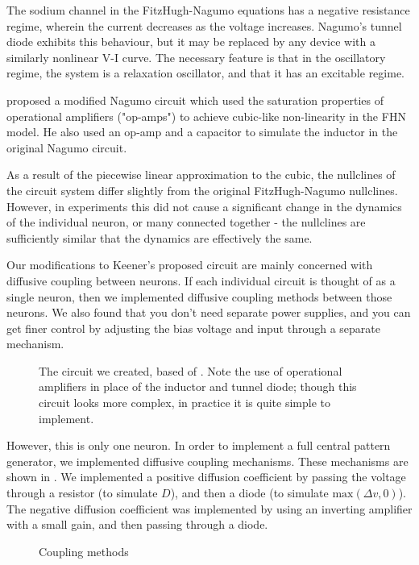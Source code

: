\documentclass[
    11pt,
]{article}
\begin{document}
The sodium channel in the FitzHugh-Nagumo equations has a negative resistance regime, wherein the current decreases as the voltage increases.  Nagumo's tunnel diode exhibits this behaviour, but it may be replaced by any device with a similarly nonlinear V-I curve.  The necessary feature is that in the oscillatory regime, the system is a relaxation oscillator, and that it has an excitable regime.

\citet{keener1983} proposed a modified Nagumo circuit which used the saturation properties of operational amplifiers ("op-amps") to achieve cubic-like non-linearity in the FHN model. He also used an op-amp and a capacitor to simulate the inductor in the original Nagumo circuit.

As a result of the piecewise linear approximation to the cubic, the nullclines of the circuit system differ slightly from the original FitzHugh-Nagumo nullclines.  However, in experiments this did not cause a significant change in the dynamics of the individual neuron, or many connected together - the nullclines are sufficiently similar that the dynamics are effectively the same.

Our modifications to Keener's proposed circuit are mainly concerned with diffusive coupling between neurons.  If each individual circuit is thought of as a single neuron, then we implemented diffusive coupling methods between those neurons.  We also found that you don't need separate power supplies, and you can get finer control by adjusting the bias voltage and input through a separate mechanism.

\begin{figure}[h!]
    \centering
    \caption{The circuit we created, based of \citet{keener1983}.  Note the use of operational amplifiers in place of the inductor and tunnel diode; though this circuit looks more complex, in practice it is quite simple to implement.}
    \label{fig: neuron_unit}
\end{figure}

However, this is only one neuron.  In order to implement a full central pattern generator, we implemented diffusive coupling mechanisms.  These mechanisms are shown in .  We implemented a positive diffusion coefficient by passing the voltage through a resistor (to simulate $D$), and then a diode (to simulate $\mathrm{max}(\Delta v, 0)$).  The negative diffusion coefficient was implemented by using an inverting amplifier with a small gain, and then passing through a diode.
\newsavebox{\tempbox}
\begin{figure}
    \centering
    \caption{Coupling methods}
    \label{fig: coupling}
\end{figure}
\end{document}

